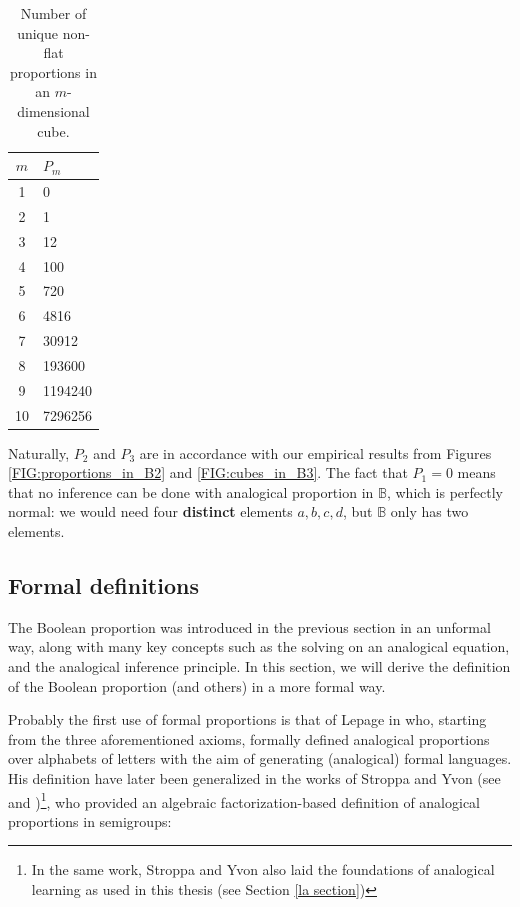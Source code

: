 \begin{table}[h!]
\centering
  \begin{tabular}{| c | l |}
\toprule
 $m$ & $P_m$\\
\midrule
    1	&	0\\
    2 &	1\\
    3	&	12\\
    4	&	100\\
    5 &	720\\
    6 &	4816\\
    7 &	30912\\
    8 &	193600\\
    9 & 1194240\\
    10 & 7296256\\
\bottomrule
\end{tabular}
\caption{Number of unique non-flat proportions in an $m$-dimensional cube.}
\label{TAB:n_params_in_cube}
\end{table}

Naturally, $P_2$ and $P_3$ are in accordance with our empirical  results from
Figures \ref{FIG:proportions_in_B2} and \ref{FIG:cubes_in_B3}. The fact that
$P_1 = 0$ means that no inference can be done with analogical proportion in
$\mathbb{B}$, which is perfectly normal: we would need four \textbf{distinct}
elements $a, b, c ,d$, but $\mathbb{B}$ only has two elements.



\subsection{Formal definitions}

The Boolean proportion was introduced in the previous section in an unformal
way, along with many key concepts such as the solving on an analogical
equation, and the analogical inference principle. In this section, we will
derive the definition of the Boolean proportion (and others) in a more formal
way.

Probably the first use of formal proportions is that of Lepage in
\cite{Lep04} who, starting from the three aforementioned axioms, formally
defined analogical proportions over alphabets of letters with the aim of
generating (analogical) formal languages. His definition have later been
generalized in the works of Stroppa and Yvon (see \cite{StrYvoCNLL05} and
\cite{StrYvoREPORT05})\footnote{In the same work, Stroppa and Yvon also laid
the foundations of analogical learning as used in this thesis (see Section
\ref{la section})}, who provided an algebraic factorization-based definition of
analogical proportions in semigroups:


